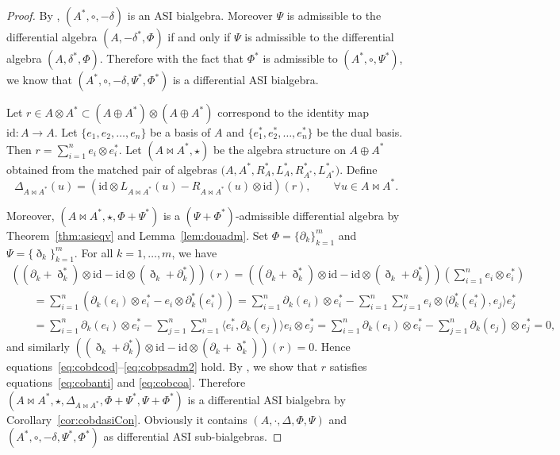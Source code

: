 \documentclass[pdftex]{sigma}
\numberwithin{equation}{section}
\newcommand{\id}{\mathrm{id}}
\begin{document}
\begin{proof}
 By \cite[Remark 2.2.4]{BaiDouble}, $(A^*, \circ,-\delta)$ is an ASI bialgebra.
 Moreover $\Psi$ is admissible to the differential algebra $(A, -\delta^*, \Phi)$ if and only if $\Psi$ is admissible to the differential algebra $(A, \delta^*, \Phi)$.
 Therefore with the fact that $\Phi^*$ is admissible to $(A^*, \circ, \Psi^*)$, we know that $(A^*, \circ, -\delta, \Psi^*, \Phi^*)$ is a differential ASI bialgebra.

 Let $r \in A \otimes A^* \subset (A \oplus A^*) \otimes (A \oplus A^*)$ correspond to the identity map $\id: A \to A$.
 Let $\{e_1,e_2,\dots,e_n\}$ be a basis of $A$ and $\{e_1^*,e_2^*,\dots,e_n^*\}$ be the dual basis.
 Then $r = \sum_{i=1}^n e_i \otimes e_i^*$.
 Let $(A \bowtie A^*, \star)$ be the algebra structure on $A \oplus A^*$ obtained from the matched pair of algebras $\big(A, A^*, R^*_A, L^*_A, R^*_{A^*}, L^*_{A^*}\big)$.
 Define
 \begin{equation*}
 \Delta_{A \bowtie A^{*}}(u) = (\id \otimes L_{A \bowtie A^{*}}(u) - R_{A \bowtie A^{*}}(u) \otimes \id)(r), \qquad \forall u \in A \bowtie A^{*}.
 \end{equation*}

	Moreover, $(A \bowtie A^*, \star, \Phi + \Psi^*)$ is a $(\Psi + \Phi^*)$-admissible differential algebra by Theorem~\ref{thm:asieqv} and Lemma~\ref{lem:douadm}.
 Set $\Phi = \{\partial_k\}_{k=1}^m$ and $\Psi = \{\eth_k\}_{k=1}^m$.
	For all $k=1, \dots, m$, we have
 \begin{gather*}
 ((\partial_k + \eth_k^*) \otimes \id - \id \otimes(\eth_k + \partial_k^*))(r) = ((\partial_k + \eth_k^*) \otimes \id - \id \otimes (\eth_k + \partial_k^*)) \left(\sum_{i=1}^n e_i \otimes e_i^*\right) \\
 \qquad{}= \sum_{i=1}^n (\partial_k(e_i) \otimes e_i^* - e_i \otimes \partial_k^*(e_i^*) ) = \sum_{i=1}^n \partial_k(e_i) \otimes e_i^* - \sum_{i=1}^n \sum_{j=1}^n e_i \otimes \langle\partial_k^*(e_i^*),e_j\rangle e_j^* \\
 \qquad{}= \sum_{i=1}^n \partial_k(e_i) \otimes e_i^* - \sum_{j=1}^n \sum_{i=1}^n \langle e_i^*, \partial_k(e_j) \rangle e_i \otimes e_j^* = \sum_{i=1}^n \partial_k(e_i)\otimes e_i^* -
 \sum_{j=1}^n \partial_k(e_j) \otimes e_j^* = 0,
	\end{gather*}
 and similarly $((\eth_k + \partial_k^*) \otimes \id - \id \otimes(\partial_k + \eth_k^*))(r) = 0$.
 Hence equations~\eqref{eq:cobdcod}--\eqref{eq:cobpsadm2} hold.
 By \cite[Theorem~2.3.6]{BaiDouble}, we show that $r$ satisfies equations~\eqref{eq:cobanti} and \eqref{eq:cobcoa}.
 Therefore $(A \bowtie A^*, \star, \Delta_{A \bowtie A^*}, \Phi + \Psi^*, \Psi + \Phi^*)$ is a differential ASI bialgebra by Corollary~\ref{cor:cobdasiCon}.
 Obviously it contains $(A, \cdot, \Delta, \Phi, \Psi)$ and $(A^*, \circ, -\delta, \Psi^*, \Phi^*)$ as differential ASI sub-bialgebras.
\end{proof}
\end{document}
